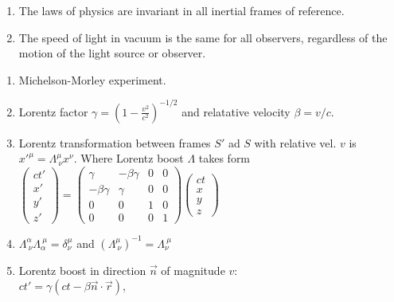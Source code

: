 \documentclass{article}
\begin{document}
\begin{multicols}{3}


    \begin{enumerate}
        \item The laws of physics are invariant in all inertial frames of reference.
        \item The speed of light in vacuum is the same for all observers, regardless of the motion of the light source or observer.
    \end{enumerate}



    \begin{enumerate}
        \item {\color{red} Michelson-Morley experiment.}
        \item Lorentz factor $\gamma=(1-\frac{v^2}{c^2})^{-1/2}$ and relatative velocity $\beta=v/c$.
        \item Lorentz transformation between frames $S'$ ad $S$ with relative vel. $v$ is $x'^\mu=\Lambda^\mu_{~\nu} x^\nu$. Where Lorentz boost $\Lambda$ takes form\\
        $\begin{pmatrix}
            ct'\\ x'\\ y' \\ z'
        \end{pmatrix}
        =\begin{pmatrix}
            \gamma & -\beta\gamma & 0 & 0\\
            -\beta\gamma & \gamma & 0 & 0\\
            0 & 0 & 1 & 0\\
            0 & 0 & 0 & 1
        \end{pmatrix}
        \begin{pmatrix}
            ct\\ x\\ y \\ z
        \end{pmatrix}$
        \item $\Lambda^\alpha_{~\nu}\Lambda^{~\mu}_\alpha=\delta^\mu_\nu$ and $(\Lambda^\mu_{~\nu})^{-1}=\Lambda^{~\mu}_\nu$
        \item Lorentz boost in direction $\vec n$ of magnitude $v$:\\
            $ct'=\gamma\left(ct-\beta\vec n\cdot\vec r\right)$,\\

\end{enumerate}
\end{multicols}
\end{document}
